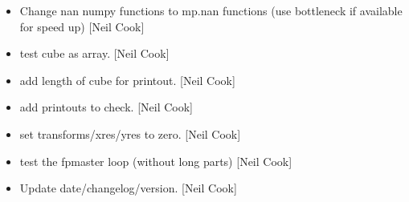 \documentclass[a4paper,10pt,english]{report}
\begin{document}
\begin{itemize}
\item {} 
Change nan numpy functions to mp.nan functions (use bottleneck if
available for speed up) {[}Neil Cook{]}

\item {} 
 \sphinxhyphen{} test cube as array. {[}Neil Cook{]}

\item {} 
 \sphinxhyphen{} add length of cube for printout. {[}Neil Cook{]}

\item {} 
 \sphinxhyphen{} add printouts to check. {[}Neil Cook{]}

\item {} 
 \sphinxhyphen{} set transforms/xres/yres to zero. {[}Neil Cook{]}

\item {} 
 \sphinxhyphen{} test the fpmaster loop (without long parts)
{[}Neil Cook{]}

\item {} 
Update date/changelog/version. {[}Neil Cook{]}

\end{itemize}
\end{document}
